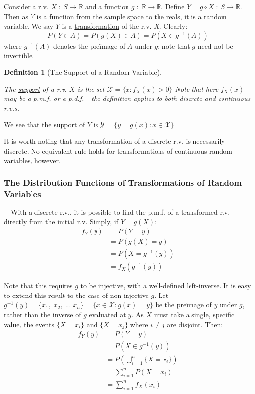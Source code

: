 \documentclass[12pt,a4paper]{article}
\newtheorem{defn}[thm]{Definition}
\begin{document}
Consider a r.v. $X \; : \; S\rightarrow\mathbb{R}$ and a function $g\; : \; \mathbb{R}\rightarrow\mathbb{R}$. Define $Y = g \circ X \; : \; S\rightarrow\mathbb{R}$. Then as $Y$ is a function from the sample space to the reals, it is a random variable. We say $Y$ is a \underline{transformation} of the r.v. $X$. Clearly:
$$P(Y \in A) = P(g(X) \in A) = P(X \in g^{-1}(A))$$
\noindent where $g^{-1}(A)$ denotes the pre\"image of $A$ under $g$; note that $g$ need not be invertible.

\begin{defn}[The Support of a Random Variable]$\;$\par
\vspace{1cm}

The \underline{support} of a r.v. $X$ is the set $\mathcal{X} = \{x : f_X(x) > 0\}$ Note that here $f_X(x)$ may be a p.m.f. or a p.d.f. - the definition applies to both discrete and continuous r.v.s.
\end{defn}

\noindent We see that the support of $Y$ is $\mathcal{Y} = \{y = g(x) : x \in \mathcal{X}\}$\par
\vspace{1cm}
\indent It is worth noting that any transformation of a discrete r.v. is necessarily discrete. No equivalent rule holds for transformations of continuous random variables, however.

\subsubsection{The Distribution Functions of Transformations of Random Variables}

$\quad$With a discrete r.v., it is possible to find the p.m.f. of a transformed r.v. directly from the initial r.v. Simply, if $Y = g(X)$:
\begin{align*}
f_Y(y) &= P(Y = y)\\
&= P(g(X) = y)\\
&= P\left(X = g^{-1}(y)\right)\\
&= f_X(g^{-1}(y))
\end{align*}

Note that this requires $g$ to be injective, with a well-defined left-inverse. It is easy to extend this result to the case of non-injective $g$. Let $g^{-1}(y) = \{x_1, \; x_2, \; ... \; x_n\} = \{x \in \mathcal{X} : g(x) = y\}$ be the pre\"image of $y$ under $g$, rather than the inverse of $g$ evaluated at $y$. As $X$ must take a single, specific value, the events $\{X = x_i\}$ and $\{X = x_j\}$ where $i \neq j$ are disjoint. Then:
\begin{align*}
f_Y(y) &= P(Y = y)\\
&= P\left(X \in g^{-1}(y)\right)\\
&= P\left(\bigcup_{i = 1}^n \{X = x_i\}\right)\\
&= \sum_{i = 1}^n P(X = x_i)\\
& = \sum_{i=1}^n f_X(x_i)
\end{align*}
\end{document}
